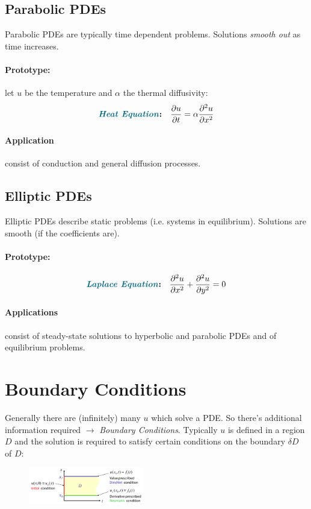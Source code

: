 \begin{multicols}{2}
\subsection{Parabolic PDEs}
Parabolic PDEs are typically time dependent problems. Solutions \emph{smooth out} as time increases.
\paragraph{Prototype:} let $u$ be the temperature and $\alpha$ the thermal diffusivity:
\begin{align*}
	\textbf{\emph{Heat Equation}:}\quad {\partial u \over \partial t} = \alpha {\partial^2 u \over \partial x^2}
\end{align*}

\paragraph{Application} consist of conduction and general diffusion processes.

\subsection{Elliptic PDEs}
Elliptic PDEs describe static problems (i.e. systems in equilibrium). Solutions are smooth (if the coefficients are).
\paragraph{Prototype:} 
\begin{align*}
	\textbf{\emph{Laplace Equation}:}\quad {\partial^2 u \over \partial x^2} + {\partial^2 u \over \partial y^2} = 0
\end{align*}

\paragraph{Applications} consist of steady-state solutions to hyperbolic and parabolic PDEs and of equilibrium problems.

\section{Boundary Conditions}
Generally there are (infinitely) many $u$ which solve a PDE. So there's additional information required $\rightarrow$ \emph{Boundary Conditions}. Typically $u$ is defined in a region $D$ and the solution is required to satisfy certain conditions on the boundary $\delta D$ of $D$:
\begin{figure}[H]
	\centering
	\includegraphics[width=0.45\textwidth]{img/03_boundary_conditions}
\end{figure}







\end{multicols}